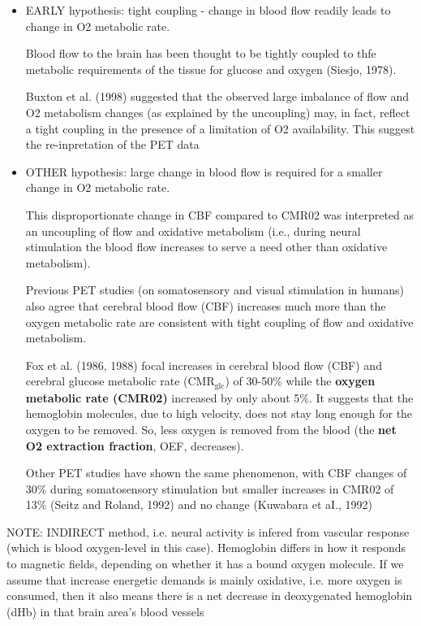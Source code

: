 \begin{mdframed}


\begin{itemize}
  \item EARLY hypothesis: tight coupling - change in blood flow readily leads to
  change in O2 metabolic rate.
  
  Blood flow to the brain has been thought to
  be tightly coupled to thfe metabolic requirements of the tissue for glucose
  and oxygen (Siesjo, 1978).
  
  Buxton et al. (1998) suggested that the observed large imbalance of flow and
  O2 metabolism changes (as explained by the uncoupling) may, in fact, reflect a
  tight coupling in the presence of a limitation of O2 availability. This
  suggest the re-inpretation of the PET data


 \item OTHER hypothesis: large change in blood flow is required for a smaller
 change in O2 metabolic rate.

This disproportionate change in CBF compared to CMR02 was interpreted as an
uncoupling of flow and oxidative metabolism (i.e., during neural stimulation the
blood flow increases to serve a need other than oxidative metabolism).

Previous PET studies (on somatosensory and visual stimulation in humans) also
agree that cerebral blood flow (CBF) increases much more than the oxygen
metabolic rate are consistent with tight coupling of flow and oxidative
metabolism.
 
Fox et al. (1986, 1988) focal increases in cerebral blood flow (CBF) and
cerebral glucose metabolic rate (CMR$_\text{glc}$) of 30-50\% while the {\bf
oxygen metabolic rate (CMR02)} increased by only about 5\%. It suggests that the
hemoglobin molecules, due to high velocity, does not stay long enough for the
oxygen to be removed. So, less oxygen is removed from the blood (the {\bf net O2
extraction fraction}, OEF, decreases).

Other PET studies have shown the same phenomenon, with CBF changes of 30\%
during somatosensory stimulation but smaller increases in CMR02 of 13\% (Seitz
and Roland, 1992) and no change (Kuwabara et aI., 1992)


\end{itemize}

\end{mdframed}

NOTE: INDIRECT method, i.e. neural activity is infered from vascular response
(which is blood oxygen-level in this case).  Hemoglobin differs in how it
responds to magnetic fields, depending on whether it has a bound oxygen
molecule. If we assume that increase energetic demands is mainly oxidative, i.e.
more oxygen is consumed, then it also means there is a net decrease in
deoxygenated hemoglobin (dHb) in that brain area's blood vessels

